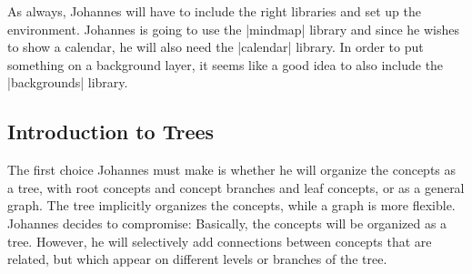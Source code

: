 As always, Johannes will have to include the right libraries and set up the
environment. Johannes is going to use the |mindmap| library and since he wishes
to show a calendar, he will also need the |calendar| library. In order to put
something on a background layer, it seems like a good idea to also include the
|backgrounds| library.


\subsection{Introduction to Trees}

The first choice Johannes must make is whether he will organize the concepts as
a tree, with root concepts and concept branches and leaf concepts, or as a
general graph. The tree implicitly organizes the concepts, while a graph is
more flexible. Johannes decides to compromise: Basically, the concepts will be
organized as a tree. However, he will selectively add connections between
concepts that are related, but which appear on different levels or branches of
the tree.

